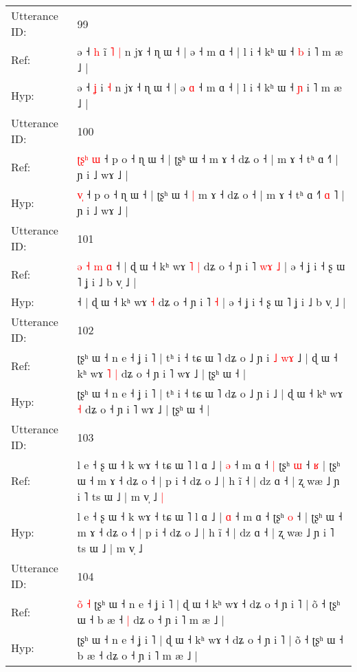 \documentclass[10pt]{article}
\DeclareRobustCommand{\hl}[1]{{\textcolor{red}{#1}}}
\begin{document}
\begin{longtable}{ll}
 \\
\midrule
Utterance ID: & 99 \\
Ref: & ə ˧ \hl{h} i\hl{̃}\hl{ }\hl{˥} \hl{|} n jɤ ˧ ɳ ɯ ˧ | ə\hl{}\hl{} ˧ m ɑ ˧ | l i ˧ kʰ ɯ ˧ \hl{b} i ˥ m æ ˩ |
 \\
Hyp: & ə ˧ \hl{ʝ} i\hl{}\hl{}\hl{} \hl{˧} n jɤ ˧ ɳ ɯ ˧ | ə\hl{ }\hl{ɑ} ˧ m ɑ ˧ | l i ˧ kʰ ɯ ˧ \hl{ɲ} i ˥ m æ ˩ |
 \\
\midrule
Utterance ID: & 100 \\
Ref: & \hl{ʈ}\hl{ʂ}\hl{ʰ}\hl{ }\hl{ɯ} ˧ p o ˧ ɳ ɯ ˧ | ʈʂʰ ɯ ˧\hl{}\hl{} m ɤ ˧ dʑ o ˧ | m ɤ ˧ tʰ ɑ ˧\hl{}\hl{}\hl{}\hl{}˥ | ɲ i ˩ wɤ ˩ |
 \\
Hyp: & \hl{}\hl{}\hl{}\hl{v}\hl{̩} ˧ p o ˧ ɳ ɯ ˧ | ʈʂʰ ɯ ˧\hl{ }\hl{|} m ɤ ˧ dʑ o ˧ | m ɤ ˧ tʰ ɑ ˧\hl{˥}\hl{ }\hl{ɑ}\hl{ }˥ | ɲ i ˩ wɤ ˩ |
 \\
\midrule
Utterance ID: & 101 \\
Ref: & \hl{ə}\hl{ }\hl{˧}\hl{ }\hl{m}\hl{ }\hl{ɑ}\hl{ }˧ | ɖ ɯ ˧ kʰ wɤ\hl{ }\hl{˥} \hl{|} dʑ o ˧ ɲ i ˥\hl{ }\hl{w}\hl{ɤ} \hl{˩} | ə ˧ ʝ i ˧ ʂ ɯ ˥ ʝ i ˩ b v̩ ˩ |
 \\
Hyp: & \hl{}\hl{}\hl{}\hl{}\hl{}\hl{}\hl{}\hl{}˧ | ɖ ɯ ˧ kʰ wɤ\hl{}\hl{} \hl{˧} dʑ o ˧ ɲ i ˥\hl{}\hl{}\hl{} \hl{˧} | ə ˧ ʝ i ˧ ʂ ɯ ˥ ʝ i ˩ b v̩ ˩ |
 \\
\midrule
Utterance ID: & 102 \\
Ref: & ʈʂʰ ɯ ˧ n e ˧ ʝ i ˥ | tʰ i ˧ tɕ ɯ ˥ dʑ o ˩ ɲ i\hl{ }\hl{˩}\hl{ }\hl{w}\hl{ɤ} ˩ | ɖ ɯ ˧ kʰ wɤ\hl{ }\hl{˥} \hl{|} dʑ o ˧ ɲ i ˥ wɤ ˩ | ʈʂʰ ɯ ˧ |
 \\
Hyp: & ʈʂʰ ɯ ˧ n e ˧ ʝ i ˥ | tʰ i ˧ tɕ ɯ ˥ dʑ o ˩ ɲ i\hl{}\hl{}\hl{}\hl{}\hl{} ˩ | ɖ ɯ ˧ kʰ wɤ\hl{}\hl{} \hl{˧} dʑ o ˧ ɲ i ˥ wɤ ˩ | ʈʂʰ ɯ ˧ |
 \\
\midrule
Utterance ID: & 103 \\
Ref: & l e ˧ ʂ ɯ ˧ k wɤ ˧ tɕ ɯ ˥ l ɑ ˩ | \hl{ə} ˧ m ɑ ˧\hl{ }\hl{|} ʈʂʰ \hl{ɯ} ˧\hl{ }\hl{ʁ} | ʈʂʰ ɯ ˧ m ɤ ˧ dʑ o ˧ | p i ˧ dʑ o ˩ | h ĩ ˧ | dz ɑ ˧ | ʐ wæ ˩ ɲ i ˥ ts ɯ ˩ | m v̩ ˩\hl{ }\hl{|}
 \\
Hyp: & l e ˧ ʂ ɯ ˧ k wɤ ˧ tɕ ɯ ˥ l ɑ ˩ | \hl{ɑ} ˧ m ɑ ˧\hl{}\hl{} ʈʂʰ \hl{o} ˧\hl{}\hl{} | ʈʂʰ ɯ ˧ m ɤ ˧ dʑ o ˧ | p i ˧ dʑ o ˩ | h ĩ ˧ | dz ɑ ˧ | ʐ wæ ˩ ɲ i ˥ ts ɯ ˩ | m v̩ ˩\hl{}\hl{}
 \\
\midrule
Utterance ID: & 104 \\
Ref: & \hl{o}\hl{̃}\hl{ }\hl{˧}\hl{ }ʈʂʰ ɯ ˧ n e ˧ ʝ i ˥ | ɖ ɯ ˧ kʰ wɤ ˧ dʑ o ˧ ɲ i ˥ | õ ˧ ʈʂʰ ɯ ˧ b æ ˧\hl{ }\hl{|} dʑ o ˧ ɲ i ˥ m æ ˩ |
 \\
Hyp: & \hl{}\hl{}\hl{}\hl{}\hl{}ʈʂʰ ɯ ˧ n e ˧ ʝ i ˥ | ɖ ɯ ˧ kʰ wɤ ˧ dʑ o ˧ ɲ i ˥ | õ ˧ ʈʂʰ ɯ ˧ b æ ˧\hl{}\hl{} dʑ o ˧ ɲ i ˥ m æ ˩ |

\end{longtable}
\end{document}
